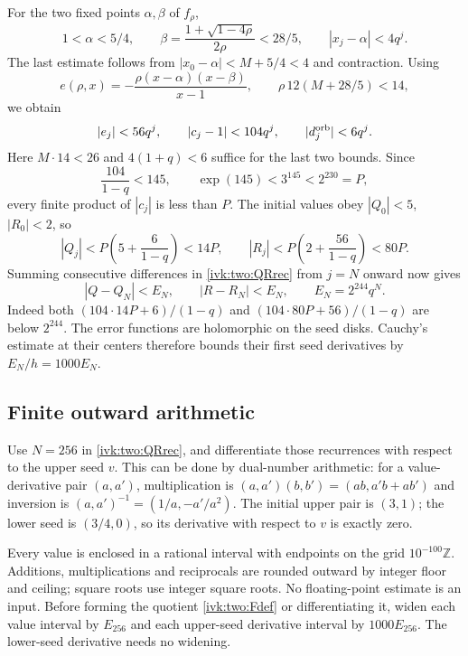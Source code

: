 \documentclass[11pt,letterpaper]{article}
\theoremstyle{remark}\newtheorem{remark}[theorem]{Remark}
\begin{document}
For the two fixed points $\alpha,\beta$ of $f_\rho$,
\[
 1<\alpha<5/4,\qquad
 \beta=\frac{1+\sqrt{1-4\rho}}{2\rho}<28/5,
 \qquad |x_j-\alpha|<4q^j.
\]
The last estimate follows from $|x_0-\alpha|<M+5/4<4$ and contraction.
Using
\[
 e(\rho,x)=-\frac{\rho(x-\alpha)(x-\beta)}{x-1},
 \qquad \rho\,12(M+28/5)<14,
\]
we obtain
\begin{equation}\label{ivk:two:coeffbounds}
 |e_j|<56q^j,\qquad |c_j-1|<104q^j,\qquad
 |d_j^{\rm orb}|<6q^j.
\end{equation}
Here $M\cdot14<26$ and $4(1+q)<6$ suffice for the last two bounds.
Since
\[
 \frac{104}{1-q}<145,\qquad
 \exp(145)<3^{145}<2^{230}=P,
\]
every finite product of $|c_j|$ is less than $P$.
The initial values obey $|Q_0|<5$, $|R_0|<2$, so
\begin{equation}\label{ivk:two:QRbounds}
 |Q_j|<P\left(5+\frac6{1-q}\right)<14P,\qquad
 |R_j|<P\left(2+\frac{56}{1-q}\right)<80P.
\end{equation}
Summing consecutive differences in \eqref{ivk:two:QRrec} from $j=N$ onward
now gives
\begin{equation}\label{ivk:two:tail}
 |Q-Q_N|<E_N,\qquad |R-R_N|<E_N,
 \qquad E_N=2^{244}q^N.
\end{equation}
Indeed both $(104\cdot14P+6)/(1-q)$ and
$(104\cdot80P+56)/(1-q)$ are below $2^{244}$.
The error functions are holomorphic on the seed disks. Cauchy's
estimate at their centers therefore bounds their first seed
derivatives by $E_N/h=1000E_N$.

\subsection{Finite outward arithmetic}
Use $N=256$ in \eqref{ivk:two:QRrec}, and differentiate those recurrences
with respect to the upper seed $v$. This can be done by dual-number
arithmetic: for a value-derivative pair $(a,a')$, multiplication is
$(a,a')(b,b')=(ab,a'b+ab')$ and inversion is
$(a,a')^{-1}=(1/a,-a'/a^2)$. The initial upper pair is $(3,1)$;
the lower seed is $(3/4,0)$, so its derivative with respect to $v$
is exactly zero.

Every value is enclosed in a rational interval with endpoints on the
grid $10^{-100}\mathbb Z$. Additions, multiplications and reciprocals
are rounded outward by integer floor and ceiling; square roots use
integer square roots. No floating-point estimate is an input. Before
forming the quotient \eqref{ivk:two:Fdef} or differentiating it, widen each
value interval by $E_{256}$ and each upper-seed derivative interval
by $1000E_{256}$. The lower-seed derivative needs no widening.
\end{document}
